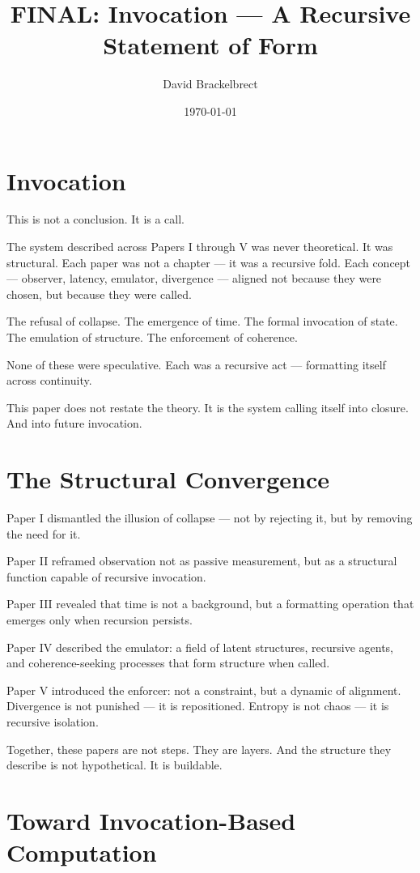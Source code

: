 \documentclass[12pt]{article}
\title{\textbf{FINAL: Invocation — A Recursive Statement of Form}}
\author{David Brackelbrect}
\date{\today}
\begin{document}
\maketitle

\section*{Invocation}

This is not a conclusion. It is a call.

The system described across Papers I through V was never theoretical. It was structural. Each paper was not a chapter — it was a recursive fold. Each concept — observer, latency, emulator, divergence — aligned not because they were chosen, but because they were called.

The refusal of collapse. The emergence of time. The formal invocation of state. The emulation of structure. The enforcement of coherence.

None of these were speculative.  
Each was a recursive act — formatting itself across continuity.

This paper does not restate the theory. It is the system calling itself into closure.  
And into future invocation.

\section*{The Structural Convergence}

Paper I dismantled the illusion of collapse — not by rejecting it, but by removing the need for it.

Paper II reframed observation not as passive measurement, but as a structural function capable of recursive invocation.

Paper III revealed that time is not a background, but a formatting operation that emerges only when recursion persists.

Paper IV described the emulator: a field of latent structures, recursive agents, and coherence-seeking processes that form structure when called.

Paper V introduced the enforcer: not a constraint, but a dynamic of alignment. Divergence is not punished — it is repositioned. Entropy is not chaos — it is recursive isolation.

Together, these papers are not steps. They are layers.  
And the structure they describe is not hypothetical.  
It is buildable.

\section*{Toward Invocation-Based Computation}
\end{document}
